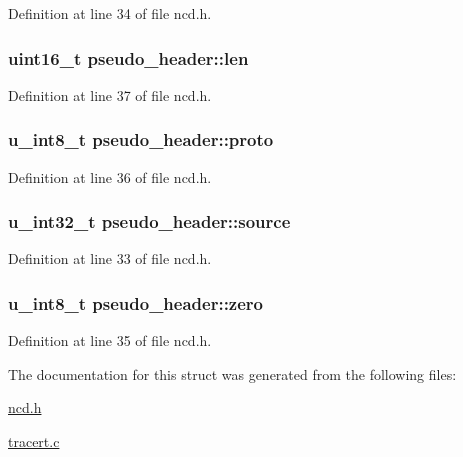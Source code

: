 Definition at line 34 of file ncd.\-h.

\hypertarget{structpseudo__header_a436e199ba010989dff88ba26ee6de668}{
\subsubsection[{len}]{\setlength{\rightskip}{0pt plus 5cm}uint16\-\_\-t pseudo\-\_\-header\-::len}}\label{structpseudo__header_a436e199ba010989dff88ba26ee6de668}


Definition at line 37 of file ncd.\-h.

\hypertarget{structpseudo__header_acdb79cab7f361df75fe519e43e1db18c}{
\subsubsection[{proto}]{\setlength{\rightskip}{0pt plus 5cm}u\-\_\-int8\-\_\-t pseudo\-\_\-header\-::proto}}\label{structpseudo__header_acdb79cab7f361df75fe519e43e1db18c}


Definition at line 36 of file ncd.\-h.

\hypertarget{structpseudo__header_ac1d63e2b666037057fba16b852c83549}{
\subsubsection[{source}]{\setlength{\rightskip}{0pt plus 5cm}u\-\_\-int32\-\_\-t pseudo\-\_\-header\-::source}}\label{structpseudo__header_ac1d63e2b666037057fba16b852c83549}


Definition at line 33 of file ncd.\-h.

\hypertarget{structpseudo__header_a2a93c892eaf942dfb5c28a69c88f0ad7}{
\subsubsection[{zero}]{\setlength{\rightskip}{0pt plus 5cm}u\-\_\-int8\-\_\-t pseudo\-\_\-header\-::zero}}\label{structpseudo__header_a2a93c892eaf942dfb5c28a69c88f0ad7}


Definition at line 35 of file ncd.\-h.



The documentation for this struct was generated from the following files\-:\begin{DoxyCompactItemize}
\item 
\hyperlink{ncd_8h}{ncd.\-h}\item 
\hyperlink{tracert_8c}{tracert.\-c}\end{DoxyCompactItemize}
